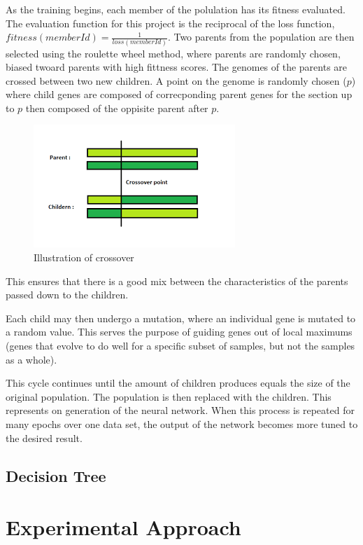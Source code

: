 \documentclass[12pt]{article}
\begin{document}
        As the training begins, each member of the polulation has its fitness evaluated.  The evaluation function for this project
        is the reciprocal of the loss function, \(fitness(memberId) = \frac{1}{loss(memberId)}\).  Two parents from the population
        are then selected using the roulette wheel method, where parents are randomly chosen, biased twoard parents with high fittness scores.
        The genomes of the parents are crossed between two new children.  A point on the genome is randomly chosen (\(p\)) where
        child genes are composed of correcponding parent genes for the section up to \(p\) then composed of the oppisite parent after \(p\).
        \begin{figure}[h]
            \includegraphics[scale=.5]{crossover.png}
            \centering
            \caption{Illustration of crossover \cite{crossoverDiagram}}
        \end{figure}

        This ensures that there is a good mix between the characteristics of the parents passed down to the children.

        Each child may then undergo a mutation, where an individual gene is mutated to a random value.  This serves the
        purpose of guiding genes out of local maximums (genes that evolve to do well for a specific subset of samples, but
        not the samples as a whole).
        
        This cycle continues until the amount of children produces equals the size of the original population.  The population
        is then replaced with the children.  This represents on generation of the neural network.
        When this process is repeated for many epochs over one data set, the output of the network becomes more
        tuned to the desired result.
        \subsection{Decision Tree}
\section{Experimental Approach}
\end{document}
